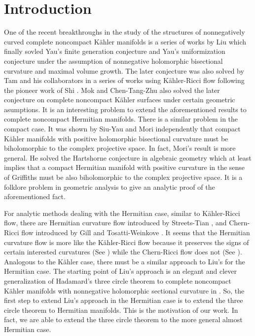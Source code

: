\documentclass[12pt]{amsart}
\theoremstyle{definition}
\theoremstyle{remark}
\numberwithin{equation}{section}
\begin{document}
\section{Introduction}
One of the recent breakthroughs in the study of the structures of nonnegatively curved complete noncompact K\"ahler manifolds is a series of works \cite{Liu,Liu-JDG,Liu-Ann,Liu-Uni} by  Liu which finally sovled Yau's finite generation conjecture and Yau's uniformization conjecture under the assumption of nonnegative holomorphic bisectional curvature and maximal volume growth. The later conjecture was also solved by Tam and his collaborators in a series of works \cite{CT,HT,LT} using K\"ahler-Ricci flow following the pioneer work of Shi \cite{Shi}. Mok \cite{Mok} and Chen-Tang-Zhu \cite{CTZ} also solved the later conjecture on complete noncompact K\"ahler surfaces under certain geometric asumptions. It is an interesting problem to extend the aforementioned results to complete noncompact Hermitian manifolds. There is a similar problem in the compact case. It was shown by Siu-Yau \cite{SY} and Mori \cite{Mori} independently that compact K\"ahler manifolds with positive holomorphic bisectional curvature must be biholomorphic to the complex projective space. In fact, Mori's result is more general. He solved the Hartshorne conjecture in algebraic geometry which at least implies that a compact Hermitian manifold with positive curvature in the sense of Griffiths must be also biholomorphic to the complex projective space. It is a folklore problem in geometric analysis to give an analytic proof of the aforementioned fact.

For analytic methods dealing with the Hermitian case, similar to K\"ahler-Ricci flow, there are Hermitian curvature flow introduced by Streets-Tian \cite{ST}, and Chern-Ricci flow introduced by Gill \cite{Gill} and Tosatti-Weinkove \cite{TW}. It seems that the Hermitian curvature flow is more like the K\"ahler-Ricci flow because it preserves the signs of certain interested curvatures (See \cite{Us1,Us2}) while the Chern-Ricci flow does not (See \cite{Yang}).  Analogous to the K\"ahler case, there must be a similar approach to Liu's for the Hermitian case. The starting point of Liu's approach is an elegant and clever generalization of Hadamard's three circle theorem to complete noncompact K\"ahler manifolds with nonnegative holomorphic sectional curvature in \cite{Liu}. So, the first step to extend Liu's approach in the Hermitian case is to extend the three circle theorem to Hermitian manifolds. This is the motivation of our work. In fact, we are able to extend the three circle theorem to the more general almost Hermitian case.
\end{document}
